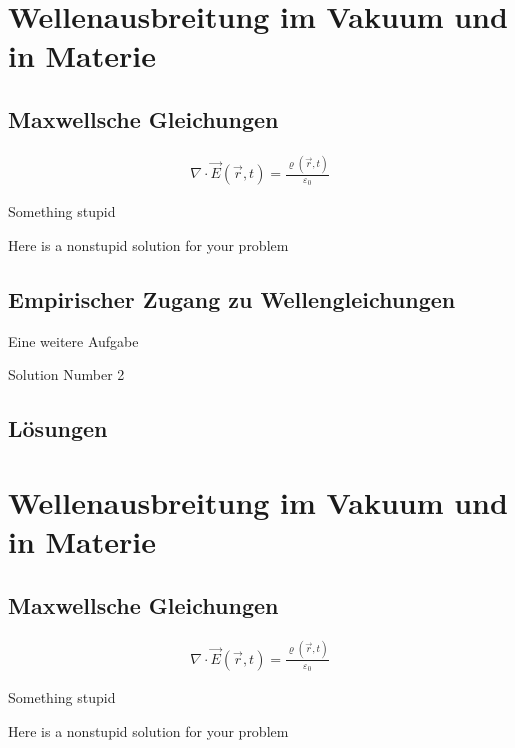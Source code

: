 \documentclass[18pt,a4paper]{article}
\begin{document}
\section{Wellenausbreitung im Vakuum und in Materie}
\subsection{Maxwellsche Gleichungen}

\begin{align*}
  \nabla \cdot \vec{E}\left(\vec{r}, t \right) =
    \frac{\varrho\left(\vec{r}, t \right)}{\varepsilon_0}
\end{align*}

\begin{exercise}[difficulty=easy]
Something stupid
\end{exercise}
\begin{solution}
Here is a nonstupid solution for your problem
\end{solution}

\subsection{Empirischer Zugang zu Wellengleichungen}

\begin{exercise}[difficulty=hard]
Eine weitere Aufgabe
\end{exercise}
\begin{solution}
Solution Number 2
\end{solution}

\subsection*{Lösungen}
\printsolutions[section,difficulty=hard]

\section{Wellenausbreitung im Vakuum und in Materie}
\subsection{Maxwellsche Gleichungen}

\begin{align*}
  \nabla \cdot \vec{E}\left(\vec{r}, t \right) =
    \frac{\varrho\left(\vec{r}, t \right)}{\varepsilon_0}
\end{align*}

\begin{exercise}[difficulty=easy]
Something stupid
\end{exercise}
\begin{solution}
Here is a nonstupid solution for your problem
\end{solution}
\end{document}
